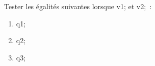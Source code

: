 \documentclass[exercice]{thedocument}%
\begin{document}
%
Tester les égalités suivantes lorsque \<v1; et \<v2;~:
\begin{enumerate}
    \item \<q1;
    \item \<q2;
    \item \<q3;
\end{enumerate}
\end{document}
